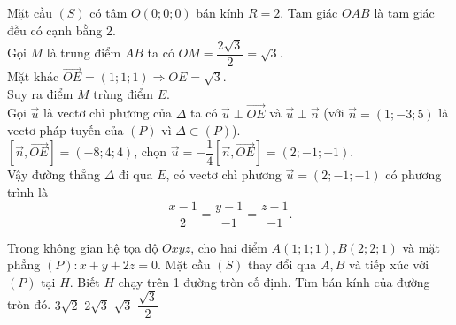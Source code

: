 \begin{ex}
{\begin{center}
\begin{tikzpicture}[scale=0.8,>=stealth, font=\footnotesize, line join=round, line cap=round]
			\end{tikzpicture}
		\end{center}
		Mặt cầu $(S)$ có tâm $O(0; 0; 0)$ bán kính $R=2$. Tam giác $O A B$ là tam giác đều có cạnh bằng 2. \\
		Gọi $M$ là trung điểm $A B$ ta có $O M=\dfrac{2 \sqrt{3}}{2}=\sqrt{3}$.\\
		Mặt khác $\overrightarrow{O E}=(1; 1; 1) \Rightarrow O E=\sqrt{3}$.\\
		Suy ra điểm $M$ trùng điểm $E$. \\
		Gọi $\overrightarrow{u}$ là vectơ chỉ phương của $\Delta$ ta có $\overrightarrow{u} \perp \overrightarrow{O E}$ và $\overrightarrow{u} \perp \overrightarrow{n}$ (với $\overrightarrow{n}=(1;-3; 5)$ là vectơ pháp tuyến của $(P)$ vì $\Delta \subset(P)$).\\
		$[\overrightarrow{n}, \overrightarrow{O E}]=(-8; 4; 4)$, chọn $\overrightarrow{u}=-\dfrac{1}{4}[\overrightarrow{n}, \overrightarrow{O E}]=(2;-1;-1)$.\\
		Vậy đường thẳng $\Delta$ đi qua $E$, có vectơ chì phương $\overrightarrow{u}=(2;-1;-1)$ có phương trình là $$\dfrac{x-1}{2}=\dfrac{y-1}{-1}=\dfrac{z-1}{-1}.$$	
	}
\end{ex}
\begin{ex}%
	Trong không gian hệ tọa độ $O x y z$, cho hai điểm $A(1; 1; 1), B(2; 2; 1)$ và mặt phẳng $(P)\colon x+y+2 z=0$. Mặt cầu $(S)$ thay đổi qua $A, B$ và tiếp xúc với $(P)$ tại $H$. Biết $H$ chạy trên 1 đường tròn cố định. Tìm bán kính của đường tròn đó.
	\choice
	{$3 \sqrt{2}$}
	{\True $2 \sqrt{3}$}
	{$\sqrt{3}$}
	{$\dfrac{\sqrt{3}}{2}$}
\end{ex}

